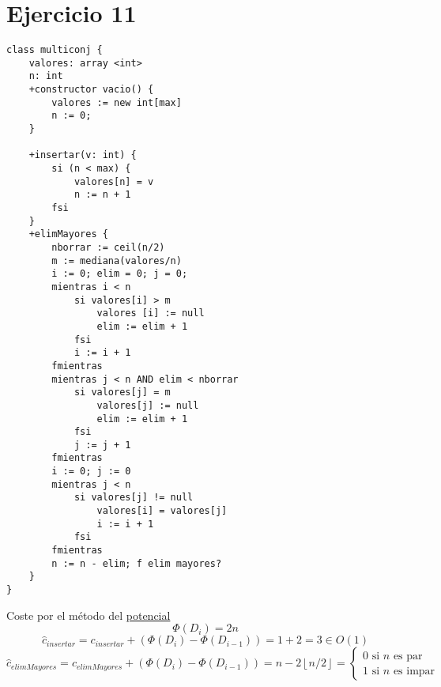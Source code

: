 \documentclass[10pt,a4paper,openright]{book}
\theoremstyle{break}
\begin{document}
\section{Ejercicio 11}%
\label{sec:ejercicio_11}
\begin{lstlisting}
class multiconj {
    valores: array <int>
    n: int
    +constructor vacio() {
        valores := new int[max]
        n := 0;
    }

    +insertar(v: int) {
        si (n < max) {
            valores[n] = v
            n := n + 1
        fsi
    }
    +elimMayores {
        nborrar := ceil(n/2)
        m := mediana(valores/n)
        i := 0; elim = 0; j = 0;
        mientras i < n
            si valores[i] > m
                valores [i] := null
                elim := elim + 1
            fsi
            i := i + 1
        fmientras
        mientras j < n AND elim < nborrar
            si valores[j] = m
                valores[j] := null
                elim := elim + 1
            fsi 
            j := j + 1
        fmientras
        i := 0; j := 0
        mientras j < n
            si valores[j] != null
                valores[i] = valores[j]
                i := i + 1
            fsi
        fmientras
        n := n - elim; f elim mayores?
    }
}
\end{lstlisting}
Coste por el método del \underline{potencial} 
\[
\Phi\left( D_i \right) = 2n
\]\[
\hat{c}_{insertar} = c_{insertar} + \left( \Phi\left( D_i \right) - \Phi\left( D_{i-1} \right) \right) = 1 + 2 = 3 \in O\left( 1 \right) 
\]\[
\hat{c}_{elimMayores} = c_{elimMayores} + \left( \Phi\left( D_i \right) - \Phi\left( D_{i-1} \right)\right) = n - 2 \left\lfloor n/2 \right\rfloor = \begin{cases}
    0 \text{ si } n \text{ es par}\\
    1 \text{ si } n \text{ es impar} 
\end{cases} 
\]
\end{document}
